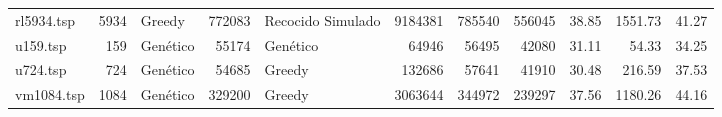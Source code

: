 \begin{table}[hbtp]
{{\begin{tabular}{lrlrlrrrrrr}
\cellcolor[HTML]{C0C0C0}rl5934.tsp   & 5934                           & Greedy                                                                                                                      & 772083                                                                          & Recocido Simulado                                               & 9184381                          & 785540                          & 556045                           & 38.85                                   & 1551.73                               & 41.27                         \\
\cellcolor[HTML]{C0C0C0}u159.tsp     & 159                            & Genético                                                                                                                    & 55174                                                                           & Genético                                                        & 64946                            & 56495                           & 42080                            & 31.11                                   & 54.33                                 & 34.25                         \\
\cellcolor[HTML]{C0C0C0}u724.tsp     & 724                            & Genético                                                                                                                    & 54685                                                                           & Greedy                                                          & 132686                           & 57641                           & 41910                            & 30.48                                   & 216.59                                & 37.53                         \\
\cellcolor[HTML]{C0C0C0}vm1084.tsp   & 1084                           & Genético                                                                                                                    & 329200                                                                          & Greedy                                                          & 3063644                          & 344972                          & 239297                           & 37.56                                   & 1180.26                               & 44.16                        
\end{tabular}
}
}
\label{table:ExperimentosComparativos}
\end{table}